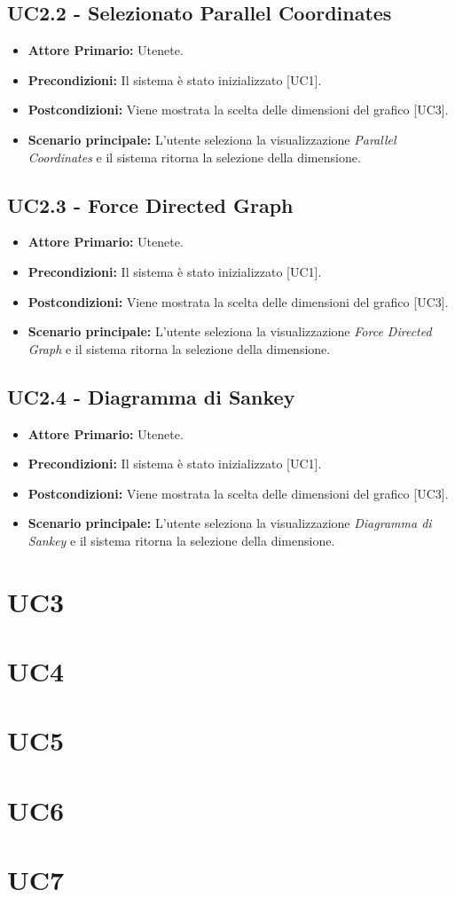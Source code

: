 \subsection{UC2.2 - Selezionato Parallel Coordinates}
\begin{itemize}
   \item \textbf{Attore Primario:} Utenete.
   \item \textbf{Precondizioni:} Il sistema è stato inizializzato [UC1].
   \item \textbf{Postcondizioni:} Viene mostrata la scelta delle dimensioni del grafico [UC3].
   \item \textbf{Scenario principale:} L'utente seleziona la visualizzazione \textit{Parallel Coordinates} e il sistema ritorna la selezione della dimensione.
\end{itemize}
\subsection{UC2.3 - Force Directed Graph}
\begin{itemize}
   \item \textbf{Attore Primario:} Utenete.
   \item \textbf{Precondizioni:} Il sistema è stato inizializzato [UC1].
   \item \textbf{Postcondizioni:} Viene mostrata la scelta delle dimensioni del grafico [UC3].
   \item \textbf{Scenario principale:} L'utente seleziona la visualizzazione \textit{Force Directed Graph} e il sistema ritorna la selezione della dimensione.
\end{itemize}
\subsection{UC2.4 - Diagramma di Sankey}
\begin{itemize}
   \item \textbf{Attore Primario:} Utenete.
   \item \textbf{Precondizioni:} Il sistema è stato inizializzato [UC1].
   \item \textbf{Postcondizioni:} Viene mostrata la scelta delle dimensioni del grafico [UC3].
   \item \textbf{Scenario principale:} L'utente seleziona la visualizzazione \textit{Diagramma di Sankey} e il sistema ritorna la selezione della dimensione.
\end{itemize}

\section{UC3}

\section{UC4}

\section{UC5}

\section{UC6}

\section{UC7}

